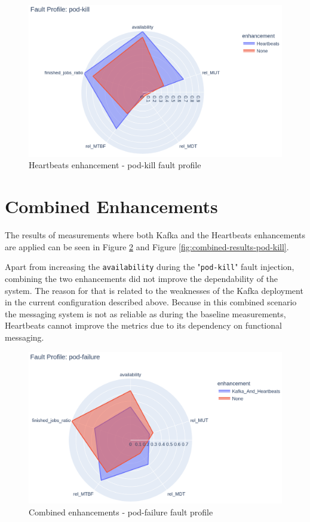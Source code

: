 \begin{figure}[h]
	\centering
	\includegraphics[width=140mm, keepaspectratio]{figures/heartbeats_with_base_pod-kill.png}
	\caption{Heartbeats enhancement - pod-kill fault profile}
	\label{fig:heartbeats-results-pod-kill}
\end{figure}

\section{Combined Enhancements}

The results of measurements where both Kafka and the Heartbeats enhancements are applied can be seen in Figure \ref{fig:combined-results-pod-failure} and Figure \ref{fig:combined-results-pod-kill}.

Apart from increasing the \texttt{availability} during the "\texttt{pod-kill}" fault injection, combining the two enhancements did not improve the dependability of the system. The reason for that is related to the weaknesses of the Kafka deployment in the current configuration described above. Because in this combined scenario the messaging system is not as reliable as during the baseline measurements, Heartbeats cannot improve the metrics due to its dependency on functional messaging.


\begin{figure}[h]
	\centering
	\includegraphics[width=140mm, keepaspectratio]{figures/kafka_and_hb_with_base_pod-failure.png}
	\caption{Combined enhancements - pod-failure fault profile}
	\label{fig:combined-results-pod-failure}
\end{figure}

